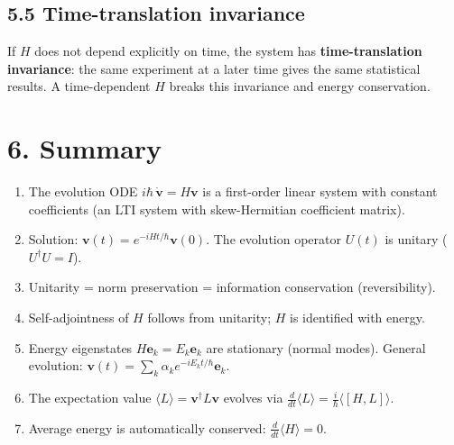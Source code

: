 \documentclass[12pt,a4paper]{article}
\begin{document}
\subsection{5.5 Time-translation invariance}
If $H$ does not depend explicitly on time, the system has \textbf{time-translation invariance}: the same experiment at a later time gives the same statistical results.  A time-dependent $H$ breaks this invariance and energy conservation.

\section{6. Summary}

\begin{enumerate}[nosep]
    \item The evolution ODE $i\hbar\,\dot{\mathbf{v}} = H\mathbf{v}$ is a first-order linear system with constant coefficients (an LTI system with skew-Hermitian coefficient matrix).
    \item Solution: $\mathbf{v}(t) = e^{-iHt/\hbar}\mathbf{v}(0)$.  The evolution operator $U(t)$ is unitary ($U^\dagger U = I$).
    \item Unitarity = norm preservation = information conservation (reversibility).
    \item Self-adjointness of $H$ follows from unitarity; $H$ is identified with energy.
    \item Energy eigenstates $H\mathbf{e}_k = E_k\mathbf{e}_k$ are stationary (normal modes).  General evolution: $\mathbf{v}(t) = \sum_k \alpha_k e^{-iE_k t/\hbar}\mathbf{e}_k$.
    \item The expectation value $\langle L \rangle = \mathbf{v}^\dagger L\mathbf{v}$ evolves via $\frac{d}{dt}\langle L \rangle = \frac{i}{\hbar}\langle [H,L] \rangle$.
    \item Average energy is automatically conserved: $\frac{d}{dt}\langle H \rangle = 0$.
\end{enumerate}
\end{document}
